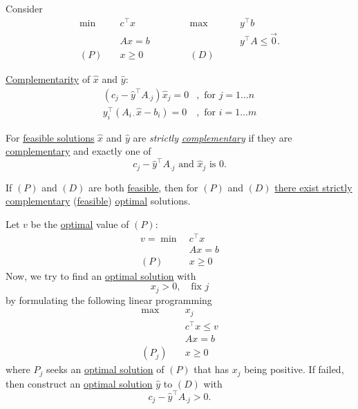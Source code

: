 \begin{eg}
	Consider
	\[
		\begin{alignedat}{5}
			\min~&c^{\top}x\qquad\qquad&&\max ~&&y^{\top}b\\
			&Ax = b 				&&		&&y^{\top}A\leq \vec{0}.\\
			(P)\quad	&x\geq  0 	&&(D)\quad&&
		\end{alignedat}
	\]
	\begin{prev}
		\hyperref[def:complementary]{Complementarity} of \(\hat{x}\) and \(\hat{y}\)\(\colon\)
		\[
			\begin{split}
				(c_{j} - \hat{y}^{\top} A_{\cdot j}) \hat{x}_j = 0&, \text{ for }j = 1\ldots n\\
				y^{\top}_i (A_{i\cdot}\hat{x} - b_{i}) = 0&, \text{ for } i = 1\ldots m
			\end{split}
		\]
	\end{prev}

	\begin{definition}
		For \hyperref[def:feasible-solution]{feasible solutions} \(\hat{x}\) and \(\hat{y}\) are \emph{strictly \hyperref[def:complementary]{complementary}} if
		they are \hyperref[def:complementary]{complementary} and exactly one of
		\[
			c_{j} - \hat{y}^{\top}A_{\cdot j}\text{ and }\hat{x}_j \text{ is } 0.
		\]
	\end{definition}

	\begin{theorem}\label{thm:strictly-complementarity}
		If \((P)\) and \((D)\) are both \hyperref[def:feasible-solution]{feasible}, then for \((P)\) and \((D)\) \underline{there exist strictly}
		\hyperref[def:complementary]{complementary} (\hyperref[def:feasible-solution]{feasible}) \hyperref[def:optimal-solution]{optimal} solutions.
	\end{theorem}

	\begin{intuition}
		Let \(v\) be the \hyperref[def:optimal-solution]{optimal} value of \((P)\)\(\colon\)
		\begin{align*}
			v = \min~ & c^{\top}x \\
			          & Ax = b    \\
			(P)\quad  & x\geq 0
		\end{align*}
		Now, we try to find an \hyperref[def:optimal-solution]{optimal solution} with
		\[
			x_{j}>0, \quad \text{fix }j
		\]
		by formulating the following linear programming
		\begin{align*}
			\max~      & x_{j}           \\
			           & c^{\top}x\leq v \\
			           & Ax = b          \\
			(P_j)\quad & x\geq  0
		\end{align*}
		where \(P_{j}\) seeks an \hyperref[def:optimal-solution]{optimal solution} of \((P)\) that has \(x_{j}\) being positive.
		If failed, then construct an \hyperref[def:optimal-solution]{optimal solution} \(\hat{y}\) to \((D)\) with
		\[
			c_{j} - \hat{y}^{\top} A_{\cdot j}>0.
		\]


\end{intuition}
\end{eg}
